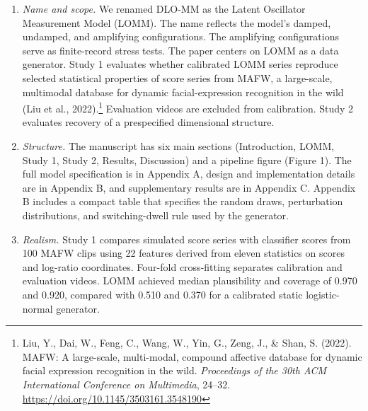 \documentclass[11pt]{article}
\begin{document}
\begin{enumerate}
  \item \textit{Name and scope.} We renamed DLO-MM as the Latent Oscillator Measurement Model (LOMM). The name reflects the model's damped, undamped, and amplifying configurations. The amplifying configurations serve as finite-record stress tests. The paper centers on LOMM as a data generator. Study 1 evaluates whether calibrated LOMM series reproduce selected statistical properties of score series from MAFW, a large-scale, multimodal database for dynamic facial-expression recognition in the wild (Liu et al., 2022).\footnote{Liu, Y., Dai, W., Feng, C., Wang, W., Yin, G., Zeng, J., \& Shan, S. (2022). MAFW: A large-scale, multi-modal, compound affective database for dynamic facial expression recognition in the wild. \textit{Proceedings of the 30th ACM International Conference on Multimedia}, 24--32. \url{https://doi.org/10.1145/3503161.3548190}} Evaluation videos are excluded from calibration. Study 2 evaluates recovery of a prespecified dimensional structure.
  \item \textit{Structure.} The manuscript has six main sections (Introduction, LOMM, Study 1, Study 2, Results, Discussion) and a pipeline figure (Figure 1). The full model specification is in Appendix A, design and implementation details are in Appendix B, and supplementary results are in Appendix C. Appendix B includes a compact table that specifies the random draws, perturbation distributions, and switching-dwell rule used by the generator.
  \item \textit{Realism.} Study 1 compares simulated score series with classifier scores from 100 MAFW clips using 22 features derived from eleven statistics on scores and log-ratio coordinates. Four-fold cross-fitting separates calibration and evaluation videos. LOMM achieved median plausibility and coverage of 0.970 and 0.920, compared with 0.510 and 0.370 for a calibrated static logistic-normal generator.

\end{enumerate}
\end{document}
